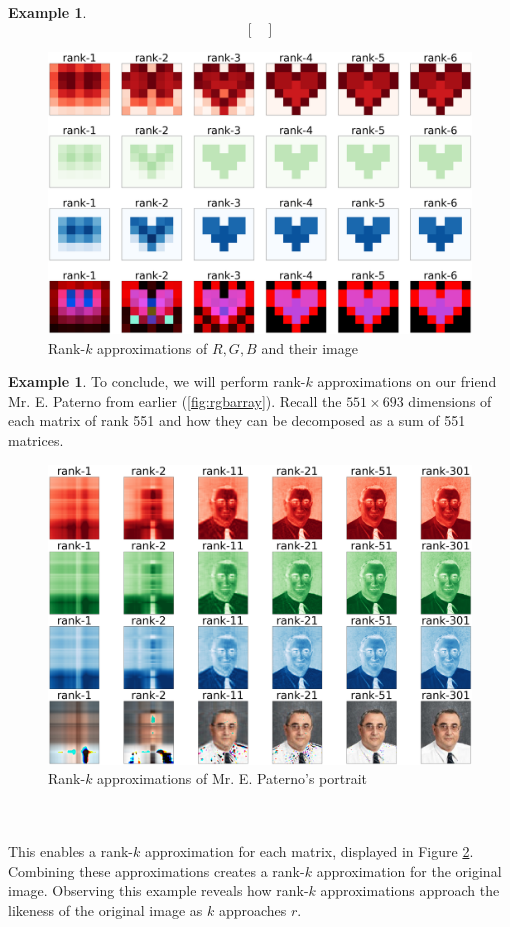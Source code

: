 \documentclass[12pt, reqno]{amsart}
\theoremstyle{definition}
\newtheorem{example}[theorem]{Example}
\theoremstyle{remark}
\numberwithin{equation}{section}
\begin{document}
\begin{example}
\begin{equation*}
\begin{bmatrix}
        \end{bmatrix}
    \end{equation*}
    \begin{figure}[h]
        \centering
        \includegraphics[width=0.61\linewidth]{img/colorheart.png}
        \caption{Rank-$k$ approximations of $R, G, B$ and their image}
        \label{fig:heartcolor}
    \end{figure}
\end{example}
\begin{example}
    To conclude, we will perform rank-$k$ approximations on our friend Mr. E. Paterno from earlier (\ref{fig:rgbarray}). Recall the $551 \times 693$ dimensions of each matrix of rank 551 and how they can be decomposed as a sum of 551 matrices.
    \begin{figure}
        \centering
        \includegraphics[width=0.7\linewidth]{img/paternoapproximation.png}
        \caption{Rank-$k$ approximations of Mr. E. Paterno's portrait}
        \label{fig:paternocolor}
    \end{figure}\\\\
    This enables a rank-$k$ approximation for each matrix, displayed in Figure \ref{fig:paternocolor}. Combining these approximations creates a rank-$k$ approximation for the original image. Observing this example reveals how rank-$k$ approximations approach the likeness of the original image as $k$ approaches $r$.
\end{example}
\end{document}
